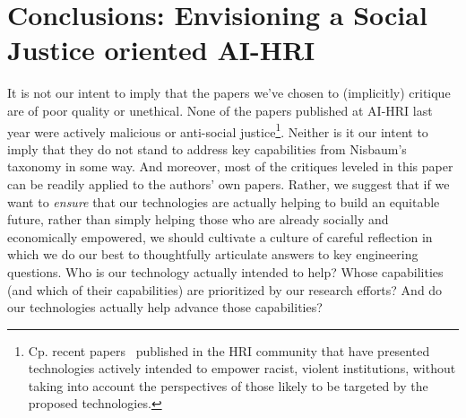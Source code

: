\documentclass[letterpaper]{article} %
\begin{document}
\section{Conclusions: Envisioning a Social Justice oriented AI-HRI}

It is not our intent to imply that the papers we've chosen to (implicitly) critique are of poor quality or unethical.
None of the papers published at AI-HRI last year were actively malicious or anti-social justice\footnote{Cp. recent papers~\cite{bordbar2021roman} published in the HRI community that have presented technologies actively intended to empower racist, violent institutions, without taking into account the perspectives of those likely to be targeted by the proposed technologies.}. Neither is it our intent to imply that they do not stand to address key capabilities from Nisbaum's taxonomy in some way.
And moreover, most of the critiques leveled in this paper can be readily applied to the authors' own papers.
Rather, we suggest that if we want to \textit{ensure} that our technologies are actually helping to build an equitable future, rather than simply helping those who are already socially and economically empowered, we should cultivate a culture of careful reflection in which we do our best to thoughtfully articulate answers to key engineering questions. Who is our technology actually intended to help? Whose capabilities (and which of their capabilities) are prioritized by our research efforts? And do our technologies actually help advance those capabilities?
\end{document}
